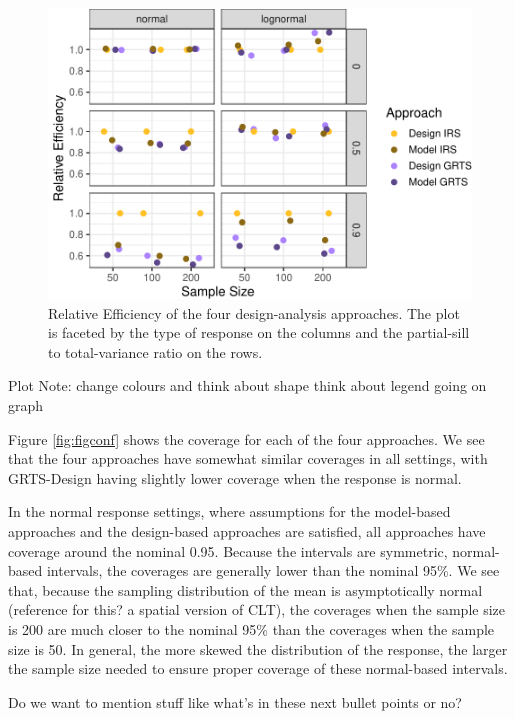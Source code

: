\documentclass[]{elsarticle} %
\begin{document}
\begin{figure}
\includegraphics[width=1\linewidth]{SpatialDVM_Manuscript_files/figure-latex/figeff-1} \caption{Relative Efficiency of the four design-analysis approaches. The plot is faceted by the type of response on the columns and the partial-sill to total-variance ratio on the rows.}\label{fig:figeff}
\end{figure}

Plot Note: change colours and think about shape think about legend going
on graph

Figure \ref{fig:figconf} shows the coverage for each of the four
approaches. We see that the four approaches have somewhat similar
coverages in all settings, with GRTS-Design having slightly lower
coverage when the response is normal.

In the normal response settings, where assumptions for the model-based
approaches and the design-based approaches are satisfied, all approaches
have coverage around the nominal 0.95. Because the intervals are
symmetric, normal-based intervals, the coverages are generally lower
than the nominal 95\%. We see that, because the sampling distribution of
the mean is asymptotically normal (reference for this? a spatial version
of CLT), the coverages when the sample size is 200 are much closer to
the nominal 95\% than the coverages when the sample size is 50. In
general, the more skewed the distribution of the response, the larger
the sample size needed to ensure proper coverage of these normal-based
intervals.

Do we want to mention stuff like what's in these next bullet points or
no?
\end{document}
